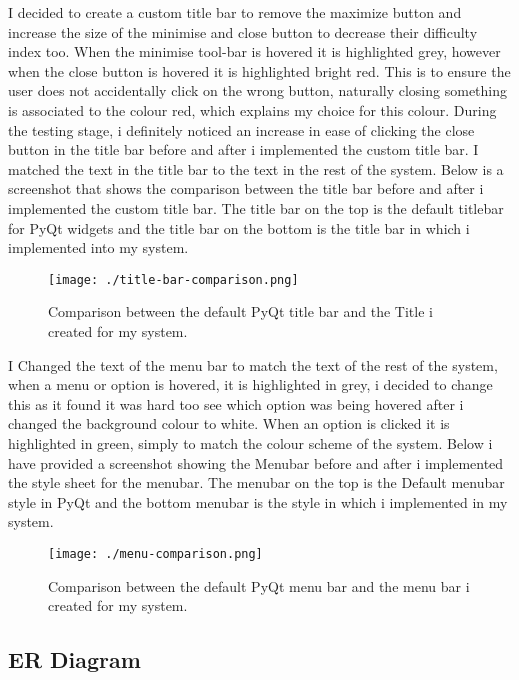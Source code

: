  I decided to create a custom title bar to remove the maximize button and increase the size of the minimise and close button to decrease their difficulty index too. When the minimise tool-bar is hovered it is highlighted grey, however when the close button is hovered it is highlighted bright red. This is to ensure the user does not accidentally click on the wrong button, naturally closing something is associated to the colour red, which explains my choice for this colour. During the testing stage, i definitely noticed an increase in ease of clicking the close button in the title bar before and after i implemented the custom title bar. I matched the text in the title bar to the text in the rest of the system. Below is a screenshot that shows the comparison between the title bar before and after i implemented the custom title bar. The title bar on the top is the default titlebar for PyQt widgets and the title bar on the bottom is the title bar in which i implemented into my system. 

\begin{figure}[H]
    \texttt{[image: ./title-bar-comparison.png]}
    \caption{Comparison between the default PyQt title bar and the Title i created for my system.} \label{fig:title-bar-comparison}
\end{figure}

I Changed the text of the menu bar to match the text of the rest of the system, when a menu or option is hovered, it is highlighted in grey, i decided to change this as it found it was hard too see which option was being hovered after i changed the background colour to white. When an option is clicked it is highlighted in green, simply to match the colour scheme of the system. Below i have provided a screenshot showing the Menubar before and after i implemented the style sheet for the menubar. The menubar on the top is the Default menubar style in PyQt and the bottom menubar is the style in which i implemented in my system.

\begin{figure}[H]
    \texttt{[image: ./menu-comparison.png]}
    \caption{Comparison between the default PyQt menu bar and the menu bar i created for my system.} \label{fig:menu-comparison}
\end{figure}





\subsection{ER Diagram}

